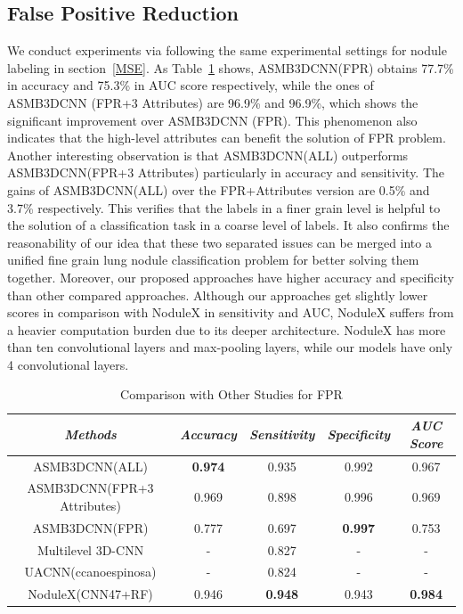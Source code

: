 \documentclass[runningheads]{llncs}
\begin{document}
\subsection{False Positive Reduction}
\label{FPR}
We conduct experiments via following the same experimental settings for nodule labeling in section~\ref{MSE}. As Table~\ref{tab5} shows,      ASMB3DCNN(FPR) obtains 77.7\% in accuracy and 75.3\% in AUC score respectively, while the ones of ASMB3DCNN (FPR+3 Attributes) are 96.9\% and 96.9\%, which shows the significant improvement over ASMB3DCNN (FPR). This phenomenon also indicates that the high-level attributes can benefit the solution of FPR problem. Another interesting observation is that ASMB3DCNN(ALL) outperforms ASMB3DCNN(FPR+3 Attributes) particularly in accuracy and sensitivity. The gains of ASMB3DCNN(ALL) over the FPR+Attributes version are 0.5\% and 3.7\% respectively. This verifies that the labels in a finer grain level is helpful to the solution of a classification task in a coarse level of labels. It also confirms the reasonability of our idea that these two separated issues can be merged into a unified fine grain lung nodule classification problem for better solving them together. Moreover, our proposed approaches have higher accuracy and specificity than other compared approaches. Although our approaches get slightly lower scores in comparison with NoduleX in sensitivity and AUC, NoduleX suffers from a heavier computation burden due to its deeper architecture. NoduleX has more than ten convolutional layers and max-pooling layers, while our models have only 4 convolutional layers.


\begin{table}[htb]
\vspace{-0.5cm}
\caption{Comparison with Other Studies for FPR}
\begin{center}
\begin{tabular}{|c|c|c|c|c|}
\hline
\textbf{\textit{Methods}} & \textbf{\textit{Accuracy}} & \textbf{\textit{Sensitivity}}& \textbf{\textit{Specificity}} & \textbf{\textit{AUC Score}} \\
\hline
ASMB3DCNN(ALL)  & {\bfseries 0.974} & 0.935 &0.992 & 0.967 \\
ASMB3DCNN(FPR+3 Attributes)  &0.969 & 0.898 & 0.996 &0.969 \\
ASMB3DCNN(FPR) &0.777  & 0.697 & {\bfseries 0.997} &0.753 \\
Multilevel 3D-CNN\cite{Qi2016Multilevel} &- & 0.827 &-&-\\
UACNN(ccanoespinosa) &- &0.824 &-&- \\
NoduleX(CNN47+RF)\cite{Causey2018Highly} &0.946 & {\bfseries 0.948} & 0.943 & {\bfseries 0.984} \\
\hline

\end{tabular}
\label{tab5}
\vspace{-1cm}
\end{center}
\vspace{-0.5cm}
\end{table}
\end{document}
